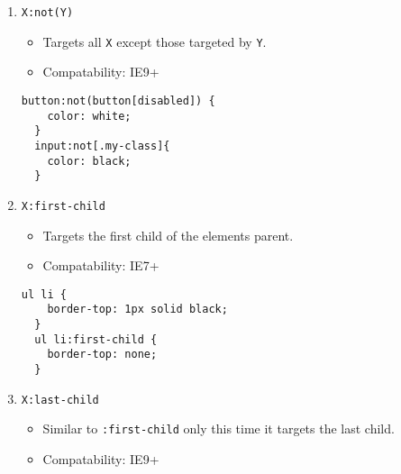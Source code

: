 \documentclass[12pt]{article}
\begin{document}
\begin{enumerate}
\item {\texttt{X:not(Y)}}
  \begin{itemize}
    \item Targets all \texttt{X} except those targeted by \texttt{Y}.
    \item Compatability: IE9+
  \end{itemize}
  \begin{lstlisting}[frame=single]
  button:not(button[disabled]) {
    color: white;
  }
  input:not[.my-class]{
    color: black;
  }
  \end{lstlisting}

\item {\texttt{X:first-child}}
  \begin{itemize}
    \item Targets the first child of the elements parent.  
    \item Compatability: IE7+
  \end{itemize}
  \begin{lstlisting}[frame=single]
  ul li {
    border-top: 1px solid black;
  }
  ul li:first-child {
    border-top: none;
  }
  \end{lstlisting}

\item {\texttt{X:last-child}}
  \begin{itemize}
    \item Similar to \texttt{:first-child} only this time it targets the last child.
    \item Compatability: IE9+
  \end{itemize}


\end{enumerate}
\end{document}
